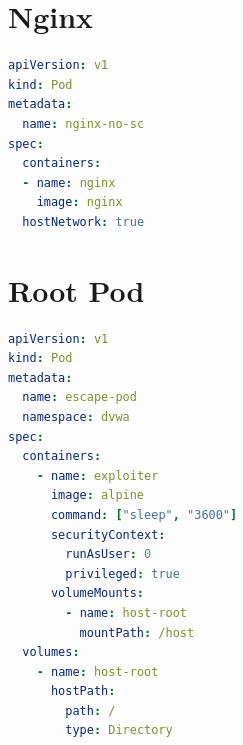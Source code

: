 \documentclass[12pt,twoside,titlepage]{report}
\begin{document}
\section{Nginx}
\begin{lstlisting}[language=yaml, caption={nginx.yaml}, label={lst:nginx}]
apiVersion: v1
kind: Pod
metadata:
  name: nginx-no-sc
spec:
  containers:
  - name: nginx
    image: nginx
  hostNetwork: true
\end{lstlisting}
\section{Root Pod}
\begin{lstlisting}[language=yaml, caption={root-pod.yaml}, label={lst:root-pod}]
apiVersion: v1
kind: Pod
metadata:
  name: escape-pod
  namespace: dvwa
spec:
  containers:
    - name: exploiter
      image: alpine
      command: ["sleep", "3600"]
      securityContext:
        runAsUser: 0
        privileged: true
      volumeMounts:
        - name: host-root
          mountPath: /host
  volumes:
    - name: host-root
      hostPath:
        path: /
        type: Directory

\end{lstlisting}




\end{document}
